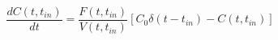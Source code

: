 \begin{equation}
\frac{dC(t,t_{in})}{dt} = \frac{F(t,t_{in})}{V(t,t_{in})}[C_0\delta(t-t_{in})-C(t,t_{in})]
\end{equation}